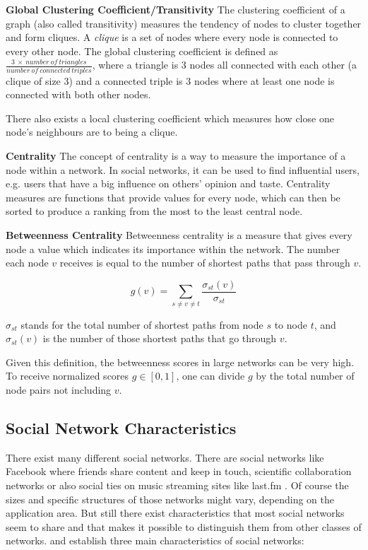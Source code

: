 \textbf{Global Clustering Coefficient/Transitivity} The clustering coefficient of a graph (also called transitivity) measures the tendency of nodes to cluster together and form cliques. A \textit{clique} is a set of nodes where every node is connected to every other node. The global clustering coefficient is defined as $\frac{3\:\times\:number\:of\:triangles}{number\:of\:connected\:triples}$, where a triangle is 3 nodes all connected with each other (a clique of size 3) and a connected triple is 3 nodes where at least one node is connected with both other nodes.

There also exists a local clustering coefficient which measures how close one node's neighbours are to being a clique.
\newline

\textbf{Centrality} The concept of centrality is a way to measure the importance of a node within a network. In social networks, it can be used to find influential users, e.g. users that have a big influence on others' opinion and taste. Centrality measures are functions that provide values for every node, which can then be sorted to produce a ranking from the most to the least central node.
\newline

\textbf{Betweenness Centrality} Betweenness centrality is a measure that gives every node a value which indicates its importance within the network. The number each node $v$ receives is equal to the number of shortest paths that pass through $v$.

\begin{equation}
g(v) = \sum_{s \neq v \neq t} \frac{\sigma_{st}(v)}{\sigma_{st}}
\label{eq:betweennesscentrality}
\end{equation}

$\sigma_{st}$ stands for the total number of shortest paths from node $s$ to node $t$, and $\sigma_{st}(v)$ is the number of those shortest paths that go through $v$.

Given this definition, the betweenness scores in large networks can be very high. To receive normalized scores $g \in [0,1]$, one can divide $g$ by the total number of node pairs not including $v$.

\subsection{Social Network Characteristics}
\label{sst:socialnetworkcharacteristics} There exist many different social networks. There are social networks like Facebook where friends share content and keep in touch, scientific collaboration networks or also social ties on music streaming sites like last.fm \cite{Lastfm}. Of course the sizes and specific structures of those networks might vary, depending on the application area. But still there exist characteristics that most social networks seem to share and that makes it possible to distinguish them from other classes of networks. \cite{Newman_2003} and \cite{Zaidi_2012} establish three main characteristics of social networks:
\newline

